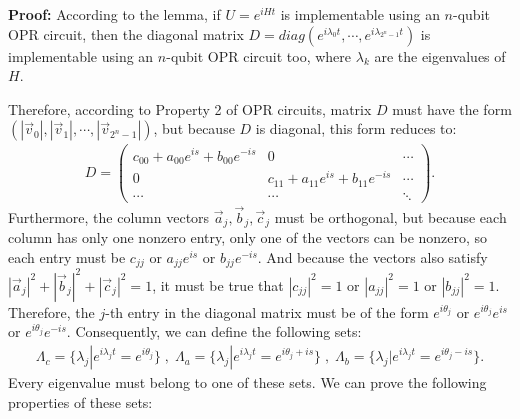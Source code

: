 \textbf{Proof:} According to the lemma, if $U = e^{iHt}$ is implementable using an $n$-qubit OPR circuit,
then the diagonal matrix $D = diag(e^{i\lambda_0 t}, \cdots, e^{i\lambda_{2^n-1}t})$ is implementable using an $n$-qubit OPR circuit too,
 where $\lambda_k$ are the eigenvalues of $H$. 

Therefore, according to Property 2 of OPR circuits,
matrix $D$ must have the form $(|\vec{v}_0|, |\vec{v}_1|, \cdots , |\vec{v}_{2^n-1}|)$, 
but because $D$ is diagonal, this form reduces to:
\begin{eqnarray}
D = \begin{pmatrix}
c_{00} + a_{00} e^{is} + b_{00} e^{-is} & 0 & \cdots  \\
0& c_{11} + a_{11} e^{is} + b_{11} e^{-is} & \cdots  \\
 \cdots & \cdots & \ddots 
\end{pmatrix}.
\end{eqnarray}
Furthermore, the column vectors $\vec{a}_j, \vec{b}_j, \vec{c}_j$ must be orthogonal, but because each column has only one nonzero entry,
only one of the vectors can be nonzero, so each entry must be $c_{jj}$ or $a_{jj} e^{is}$ or $b_{jj} e^{-is}$. 
And because the vectors also satisfy $|\vec{a}_j|^2 + |\vec{b}_j|^2 + |\vec{c}_j|^2 = 1$, it must be true that $|c_{jj}|^2 = 1 $
or $|a_{jj}|^2 = 1$ or $|b_{jj}|^2 =1$.
Therefore, the $j$-th entry in the diagonal matrix must be of the form $e^{i \theta_{j}}$ or
$e^{i \theta_{j}} e^{is}$ or $e^{i \theta_j} e^{-is}$. Consequently, we can define the following sets:
\begin{eqnarray}
\Lambda_c = \{\lambda_j  | e^{i\lambda_j t} = e^{i \theta_j}\} \; ,\;
\Lambda_a = \{\lambda_j  | e^{i\lambda_j t} = e^{i \theta_j + is}\} \;,\;
\Lambda_b = \{\lambda_j  | e^{i\lambda_j t} = e^{i \theta_j-is}\}.
\end{eqnarray}
Every eigenvalue must belong to one of these sets. We can prove the following properties of these sets:
